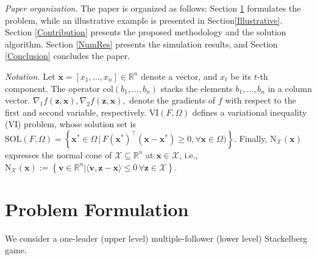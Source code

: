 \documentclass[letterpaper, 10 pt, conference]{ieeeconf}
\newcommand{\real}{\mathbb{R}}
\newcommand\vbf{\mathbf{v}}
\newcommand\xbf{\mathbf{x}}
\newcommand\zbf{\mathbf{z}}
\begin{document}
\smallskip
\noindent
\emph{Paper organization.}
The paper is organized as follows: Section \ref{Formulation} formulates the problem, while an illustrative example is presented in Section\ref{Illustrative}. Section \ref{Contribution} presents the proposed methodology and the solution algorithm. Section \ref{NumRes} presents the simulation results, and Section \ref{Conclusion} concludes the paper.

\smallskip
\noindent
\emph{Notation.}
Let $\xbf=[x_1, ... , x_n] \in \real^n$ denote a vector, and $x_t$ be its $t$-th component. The operator $\mathrm{col}(b_1,\dots,b_n)$ stacks the elements $b_1,\dots,b_n$ in a column vector. $\nabla_1 f(\zbf, \xbf), \nabla_2f(\zbf, \xbf),$ denote the gradients of $f$ with respect to the first and second variable, respectively. $\mathrm{VI}(F,\Omega)$ defines a variational inequality (VI) problem, whose solution set is $\mathrm{SOL}(F,\Omega)=\left\{\xbf^* \in \Omega\,|\,F(\xbf^*)^\top(\xbf-\xbf^*)\ge0, \forall \xbf \in \Omega)\right\}$. Finally, $\mathrm{N}_\mathcal{X}(\xbf)$ expresses the normal cone of $\mathcal{X}\subseteq \real^n$ at $\xbf \in \mathcal{X}$, i.e., $\mathrm{N}_\mathcal{X}(\xbf):=\left\{\vbf \in \real^n | \langle \vbf, \zbf-\xbf\rangle \le 0 \, \forall \zbf \in \mathcal{X}\right\}$.


\section{Problem Formulation}\label{Formulation}
We consider a one-leader (upper level) multiple-follower (lower level) Stackelberg game.
\end{document}
